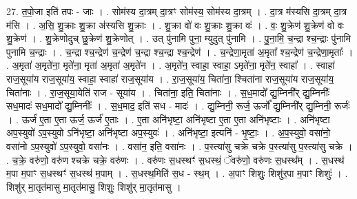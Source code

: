 \documentclass[17pt]{extarticle}
\begin{document}
27. त॒पो॒जा इति॑ तपः - जाः । . सोम॑स्य दा॒त्रम् दा॒त्रꣳ सोम॑स्य॒ सोम॑स्य दा॒त्रम् । . दा॒त्र म॑स्यसि दा॒त्रम् दा॒त्र म॑सि । . अ॒सि॒ शु॒क्राः शु॒क्रा अ॑स्यसि शु॒क्राः । . शु॒क्रा वो॑ वः शु॒क्राः शु॒क्रा वः॑ । . वः॒ शु॒क्रेण॑ शु॒क्रेण॑ वो वः शु॒क्रेण॑ । . शु॒क्रेणोदुच् छु॒क्रेण॑ शु॒क्रेणोत् । . उत् पु॑नामि पुना॒ म्युदुत् पु॑नामि । . पु॒ना॒मि॒ च॒न्द्रा श्च॒न्द्राः पु॑नामि पुनामि च॒न्द्राः । . च॒न्द्रा श्च॒न्द्रेण॑ च॒न्द्रेण॑ च॒न्द्रा श्च॒न्द्रा श्च॒न्द्रेण॑ । . च॒न्द्रेणा॒मृता॑ अ॒मृता᳚ श्च॒न्द्रेण॑ च॒न्द्रेणा॒मृताः᳚ । . अ॒मृता॑ अ॒मृते॑ना॒ मृते॑ना॒ मृता॑ अ॒मृता॑ अ॒मृते॑न । . अ॒मृते॑न॒ स्वाहा॒ स्वाहा॒ ऽमृते॑ना॒ मृते॑न॒ स्वाहा᳚ । . स्वाहा॑ राज॒सूया॑य राज॒सूया॑य॒ स्वाहा॒ स्वाहा॑ राज॒सूया॑य । . रा॒ज॒सूया॑य॒ चिता॑ना॒ श्चिता॑ना राज॒सूया॑य राज॒सूया॑य॒ चिता॑नाः । . रा॒ज॒सूया॒येति॑ राज - सूया॑य । . चिता॑ना॒ इति॒ चिता॑नाः । . स॒ध॒मादो᳚ द्यु॒म्निनी᳚र् द्यु॒म्निनीः᳚ सध॒मादः॑ सध॒मादो᳚ द्यु॒म्निनीः᳚ । . स॒ध॒माद॒ इति॑ सध - मादः॑ । . द्यु॒म्निनी॒ रूर्ज॒ ऊर्जो᳚ द्यु॒म्निनी᳚र् द्यु॒म्निनी॒ रूर्जः॑ । . ऊर्ज॑ ए॒ता ए॒ता ऊर्ज॒ ऊर्ज॑ ए॒ताः । . ए॒ता अनि॑भृष्टा॒ अनि॑भृष्टा ए॒ता ए॒ता अनि॑भृष्टाः । . अनि॑भृष्टा अप॒स्युवो॑ ऽप॒स्युवो ऽनि॑भृष्टा॒ अनि॑भृष्टा अप॒स्युवः॑ । . अनि॑भृष्टा॒ इत्यनि॑ - भृ॒ष्टाः॒ । . अ॒प॒स्युवो॒ वसा॑नो॒ वसा॑नो ऽप॒स्युवो॑ ऽप॒स्युवो॒ वसा॑नः । . वसा॑न॒ इति॒ वसा॑नः । . प॒स्त्या॑सु चक्रे चक्रे प॒स्त्या॑सु प॒स्त्या॑सु चक्रे । . च॒क्रे॒ वरु॑णो॒ वरु॑ण श्चक्रे चक्रे॒ वरु॑णः । . वरु॑णः स॒धस्थꣳ॑ स॒धस्थं॒ ॅवरु॑णो॒ वरु॑णः स॒धस्थ᳚म् । . स॒धस्थ॑ म॒पा म॒पाꣳ स॒धस्थꣳ॑ स॒धस्थ॑ म॒पाम् । . स॒धस्थ॒मिति॑ स॒ध - स्थ॒म् । . अ॒पाꣳ शिशुः॒ शिशु॑र॒पा म॒पाꣳ शिशुः॑ । . शिशु॑र् मा॒तृत॑मासु मा॒तृत॑मासु॒ शिशुः॒ शिशु॑र् मा॒तृत॑मासु । \newline
\end{document}
